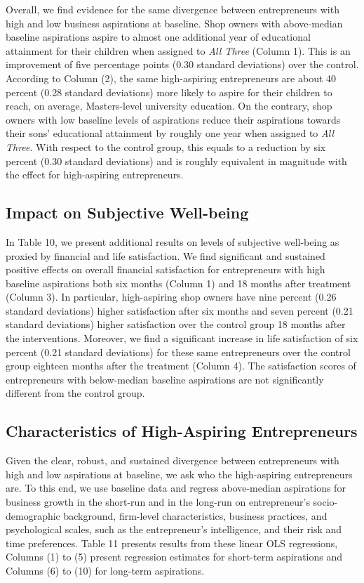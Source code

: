 \documentclass[11.5pt]{article}
\begin{document}
Overall, we find evidence for the same divergence between entrepreneurs with high and low business aspirations at baseline. Shop owners with above-median baseline aspirations aspire to almost one additional year of educational attainment for their children when assigned to \emph{All Three} (Column 1). This is an improvement of five percentage points (0.30 standard deviations) over the control. According to Column (2), the same high-aspiring entrepreneurs are about 40 percent (0.28 standard deviations) more likely to aspire for their children to reach, on average, Masters-level university education. On the contrary, shop owners with low baseline levels of aspirations reduce their aspirations towards their sons' educational attainment by roughly one year when assigned to \emph{All Three}. With respect to the control group, this equals to a reduction by six percent (0.30 standard deviations) and is roughly equivalent in magnitude with the effect for high-aspiring entrepreneurs.

\subsection{Impact on Subjective Well-being}

In Table 10, we present additional results on levels of subjective well-being as proxied by financial and life satisfaction. We find significant and sustained positive effects on overall financial satisfaction for entrepreneurs with high baseline aspirations both six months (Column 1) and 18 months after treatment (Column 3). In particular, high-aspiring shop owners have nine percent (0.26 standard deviations) higher satisfaction after six months and seven percent (0.21 standard deviations) higher satisfaction over the control group 18 months after the interventions. Moreover, we find a significant increase in life satisfaction of six percent (0.21 standard deviations) for these same entrepreneurs over the control group eighteen months after the treatment (Column 4). The satisfaction scores of entrepreneurs with below-median baseline aspirations are not significantly different from the control group.

\subsection{Characteristics of High-Aspiring Entrepreneurs}

Given the clear, robust, and sustained divergence between entrepreneurs with high and low aspirations at baseline, we ask who the high-aspiring entrepreneurs are. To this end, we use baseline data and regress above-median aspirations for business growth in the short-run and in the long-run on entrepreneur's socio-demographic background, firm-level characteristics, business practices, and psychological scales, such as the entrepreneur's intelligence, and their risk and time preferences. Table 11 presents results from these linear OLS regressions, Columns (1) to (5) present regression estimates for short-term aspirations and Columns (6) to (10) for long-term aspirations.
\end{document}
